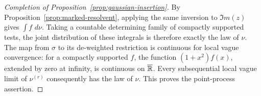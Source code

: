 \begin{proof}[Completion of Proposition~\ref{prop:gaussian-insertion}]
By Proposition~\ref{prop:marked-resolvent}, applying the same inversion to
\(\Im m(z)\) gives \(\int f\,\,d\nu\). Taking a countable determining
family of compactly supported tests, the joint distribution of these
integrals is therefore exactly the law of \(\nu\).
The map from \(\sigma\) to its de-weighted restriction is continuous for
local vague convergence: for a compactly supported \(f\), the function
\((1+x^2)f(x)\), extended by zero at infinity, is continuous on
\(\overline{\mathbb R}\). Every subsequential local vague limit of
\(\nu^{(r)}\) consequently has the law of \(\nu\).
This proves the point-process assertion.
\end{proof}
